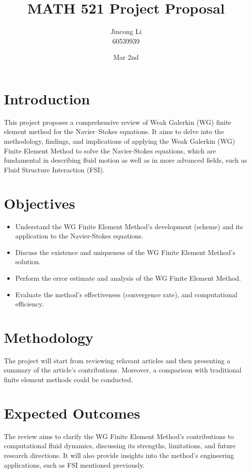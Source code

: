 \documentclass[a4paper,11pt]{article} %
\begin{document}
\setlength{\parskip}{1em} 
\setlength{\parindent}{0pt}
\newcommand{\vect}[1]{\mathbf{#1}}

\title{MATH 521 Project Proposal}
\author{Jincong Li \\ 60539939}
\date{Mar 2nd}
\maketitle

\section{Introduction}
This project proposes a comprehensive review of Weak Galerkin (WG) finite element 
method for the Navier–Stokes equations. It aims to delve into the methodology, findings, 
and implications of applying the Weak Galerkin (WG) Finite Element Method to solve 
the Navier-Stokes equations, which are fundamental in describing fluid motion as well as in 
more advanced fields, such as Fluid Structure Interaction (FSI).

\section{Objectives}
\begin{itemize}
    \item Understand the WG Finite Element Method's development (scheme) and its application to the Navier-Stokes equations.
    \item Discuss the existence and uniqueness of the WG Finite Element Method's solution.
    \item Perform the error estimate and analysis of the WG Finite Element Method.
    \item Evaluate the method's effectiveness (convergence rate), and computational efficiency.
    
\end{itemize}

\section{Methodology}
The project will start from reviewing relavant articles and then presenting a summary of the article's contributions. 
Moreover, a comparison with traditional finite element methods could be conducted.

\section{Expected Outcomes}
The review aims to clarify the WG Finite Element Method's contributions to computational 
fluid dynamics, discussing its strengths, limitations, and future research directions. 
It will also provide insights into the method's engineering applications, such as FSI mentioned previously.
\end{document}
